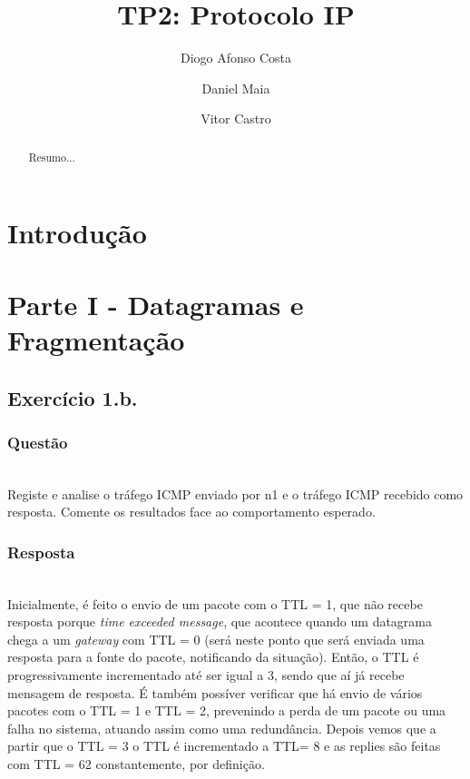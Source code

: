 \documentclass{llncs}
\begin{document}
\mainmatter
\title{TP2: Protocolo IP}


\author{Diogo Afonso Costa \and Daniel Maia \and Vitor Castro}




\date{}


\maketitle
\begin{abstract}
Resumo...
\end{abstract}

\section{Introdução}

\section{Parte I - Datagramas e Fragmentação}

\subsection{Exercício 1.b.}
\subsubsection{Questão}\rule[-10pt]{0pt}{10pt}\\

Registe e analise o tráfego ICMP enviado por n1 e o tráfego ICMP recebido como resposta. Comente os resultados face ao comportamento esperado.

\subsubsection{Resposta}\rule[-10pt]{0pt}{10pt}\\

Inicialmente, é feito o envio de um pacote com o TTL = 1, que não recebe resposta porque \textit{time exceeded message}, que acontece quando um datagrama chega a um \textit{gateway} com TTL = 0 (será neste ponto que será enviada uma resposta para a fonte do pacote, notificando da situação). Então, o TTL é progressivamente incrementado até ser igual a 3, sendo que aí já recebe mensagem de resposta. É também possíver verificar que há envio de vários pacotes com o TTL = 1 e TTL = 2, prevenindo a perda de um pacote ou uma falha no sistema, atuando assim como uma redundância. Depois vemos que a partir que o TTL = 3 o TTL é incrementado a TTL= 8 e as replies são feitas com TTL = 62 constantemente, por definição.
\end{document}
